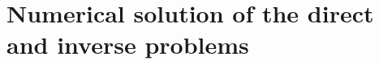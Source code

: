 \documentclass[reqno]{amsart}
\newcommand{\Lcal}{\mathcal L}
\begin{document}




\section{Numerical solution of the direct and inverse problems}\label{4}
\end{document}
